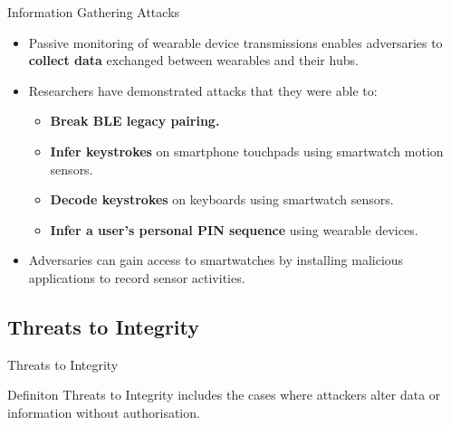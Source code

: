 \documentclass[ucs,9pt,usenames,dvipsnames]{beamer}
\begin{document}
\begin{frame}{Information Gathering Attacks}
	\begin{itemize}
		\item Passive monitoring of wearable device transmissions enables adversaries to \textbf{collect data} exchanged between wearables and their hubs. 
		\item Researchers have demonstrated attacks that they were able to:
		\begin{itemize}
			\item \textbf{Break BLE legacy pairing.}
			\item \textbf{Infer keystrokes} on smartphone touchpads using smartwatch motion sensors.
			\item \textbf{Decode keystrokes} on keyboards using smartwatch sensors.
			\item \textbf{Infer a user's personal PIN sequence} using wearable devices.
		\end{itemize} 
		
		\item Adversaries can gain access to smartwatches by installing malicious applications to record sensor activities. 
	\end{itemize}
\end{frame}
\fi

\subsection{Threats to Integrity}


\begin{frame}{Threats to Integrity}
	\begin{alertblock}{Definiton}
		Threats to Integrity includes the cases  where attackers alter data or information without authorisation. 
	\end{alertblock}
	
	
\end{frame}
\end{document}
